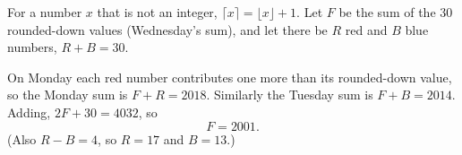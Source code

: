 For a number $x$ that is not an integer, $\lceil x\rceil=\lfloor x\rfloor+1$. Let $F$ be the sum of the $30$ rounded-down values (Wednesday's sum), and let there be $R$ red and $B$ blue numbers, $R+B=30$.

On Monday each red number contributes one more than its rounded-down value, so the Monday sum is $F+R=2018$. Similarly the Tuesday sum is $F+B=2014$. Adding, $2F+30=4032$, so
\[
F=\boxed{2001}.
\]
(Also $R-B=4$, so $R=17$ and $B=13$.)
